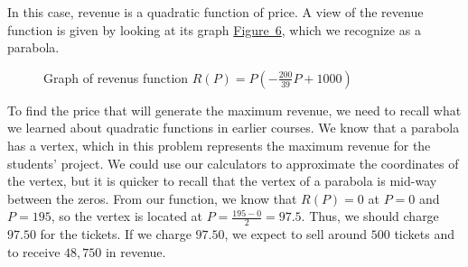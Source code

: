 \documentclass[10pt,]{book}
\theoremstyle{ptxdefinitionnotitle}
\theoremstyle{ptxdefinitiontitle}
\numberwithin{equation}{section}
\begin{document}
%
\par
\hypertarget{p-29}{}%
In this case, revenue is a quadratic function of price. A view of the revenue function is given by looking at its graph \hyperref[graph-of-revenue]{Figure~6}, which we recognize as a parabola.%
\begin{figure}
\centering
{
}
\caption{Graph of revenus function \(R \left(P \right) = P \left( - \frac{200}{39}P + 1000 \right)\)\label{graph-of-revenue}}
\end{figure}
\hypertarget{p-30}{}%
To find the price that will generate the maximum revenue, we need to recall what we learned about quadratic functions in earlier courses. We know that a parabola has a vertex, which in this problem represents the maximum revenue for the students’ project. We could use our calculators to approximate the coordinates of the vertex, but it is quicker to recall that the vertex of a parabola is mid-way between the zeros. From our function, we know that \(R \left(P \right) = 0\) at \(P = 0\) and \(P = 195\), so the vertex is located at \(P = \frac{195 - 0}{2} = 97.5\). Thus, we should charge \textdollar{}\(97.50\) for the tickets. If we charge \textdollar{}\(97.50\), we expect to sell around \(500\) tickets and to receive \textdollar{}\(48,750\) in revenue.%
\typeout{************************************************}
\typeout{************************************************}
\end{document}
